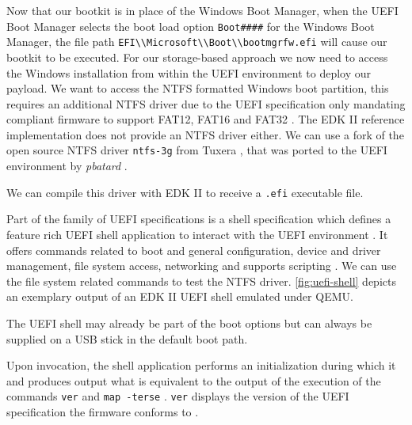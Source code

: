 Now that our bootkit is in place of the Windows Boot Manager, when the \ac{UEFI} Boot Manager selects the boot load option \lstinline{Boot####} for the Windows Boot Manager, the file path \lstinline{EFI\\Microsoft\\Boot\\bootmgrfw.efi} will cause our bootkit to be executed.
For our storage-based approach we now need to access the Windows installation from within the \ac{UEFI} environment to deploy our payload. We want to access the \ac{NTFS} formatted Windows boot partition, this requires an additional \ac{NTFS} driver due to the \ac{UEFI} specification only mandating compliant firmware to support FAT12, FAT16 and FAT32 \cite[13.3.1.1]{uefi-spec}. The \ac{EDK} II reference implementation does not provide an \ac{NTFS} driver either.
We can use a fork of the open source \ac{NTFS} driver \lstinline{ntfs-3g} from Tuxera \cite{ntfs-3g}, that was ported to the \ac{UEFI} environment by \emph{pbatard} \cite{ntfs-3g-uefi}.

We can compile this driver with \ac{EDK} II to receive a \lstinline{.efi} executable file.

Part of the family of \ac{UEFI} specifications is a shell specification which defines a feature rich \ac{UEFI} shell application to interact with the \ac{UEFI} environment \cite[1.1]{uefi-shell-spec}. It offers commands related to boot and general configuration, device and driver management, file system access, networking \cite[5.1]{uefi-shell-spec} and supports scripting \cite[4]{uefi-shell-spec}. We can use the file system related commands to test the \ac{NTFS} driver.
\autoref{fig:uefi-shell} depicts an exemplary output of an EDK II UEFI shell emulated under QEMU.

The \ac{UEFI} shell may already be part of the boot options but can always be supplied on a \ac{USB} stick in the default boot path.

Upon invocation, the shell application performs an initialization during which it  and produces output what is equivalent to the output of the execution of the commands \lstinline{ver} and \lstinline{map -terse} \cite[3.3 Initialization]{uefi-shell-spec}. \lstinline{ver} displays the version of the \ac{UEFI} specification the firmware conforms to \cite[5.3 Shell Commands]{uefi-shell-spec}.

